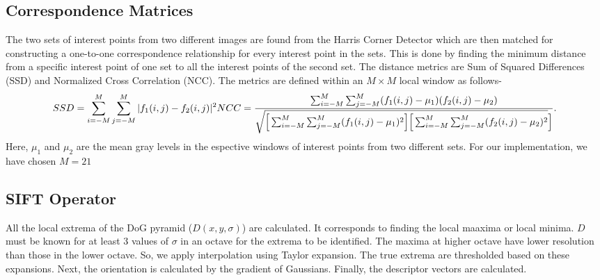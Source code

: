 \documentclass{article}
\begin{document}
\subsection{Correspondence Matrices}
The two sets of interest points from two different images are found from the Harris Corner Detector which are then matched for constructing a one-to-one correspondence relationship for every interest point in the sets. This is done by finding the minimum distance from a specific interest point of one set to all the interest points of the second set. The distance metrics are Sum of Squared Differences (SSD) and Normalized Cross Correlation (NCC). The metrics are defined within an $M\times M$ local window as follows-
\begin{equation}
	SSD = \sum_{i=-M}^{M}\sum_{j=-M}^{M}|f_1(i,j) - f_2(i,j)|^2\\
	NCC = \frac{\sum_{i=-M}^M\sum_{j=-M}^M(f_1(i,j)-\mu_1)(f_2(i,j)-\mu_2)}{\sqrt{\Big[\sum_{i=-M}^M\sum_{j=-M}^M(f_1(i,j)-\mu_1)^2\Big]\Big[\sum_{i=-M}^M\sum_{j=-M}^M(f_2(i,j)-\mu_2)^2}\Big]}.
\end{equation}
Here, $\mu_1$ and $\mu_2$ are the mean gray levels in the espective windows of interest points from two different sets. For our implementation, we have chosen $M=21$
\subsection{SIFT Operator}
All the local extrema of the DoG pyramid ($D(x,y,\sigma)$) are calculated. It corresponds to finding the local maaxima or local minima. $D$ must be known for at least 3 values of $\sigma$ in an octave for the extrema to be identified. The maxima at higher octave have lower resolution than those in the lower octave. So, we apply interpolation using Taylor expansion. The true extrema are thresholded based on these expansions. Next, the orientation is calculated by the gradient of Gaussians. Finally, the descriptor vectors are calculated.
\newpage
\end{document}
